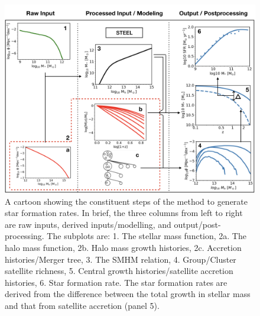 \begin{figure}[h]
    \centering
    \includegraphics[width = \linewidth]{Figures/Chapter4/SFRFullCartoon.png}
    \caption{A cartoon showing the constituent steps of the method to generate star formation rates. In brief, the three columns from left to right are raw inputs, derived inputs/modelling, and output/post-processing. The subplots are: 1. The stellar mass function, 2a. The halo mass function, 2b. Halo mass growth histories, 2c. Accretion histories/Merger tree, 3. The SMHM relation, 4. Group/Cluster satellite richness, 5. Central growth histories/satellite accretion histories, 6. Star formation rate. The star formation rates are derived from the difference between the total growth in stellar mass and that from satellite accretion (panel 5).}
    \label{fig:SFRDerevation_Cartoon}
\end{figure}

